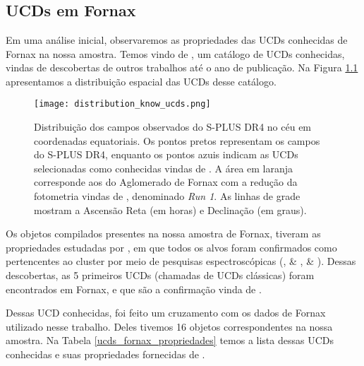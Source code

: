 \chapter{\chapternameanalysis}\label{analise}

\section{UCDs em Fornax}
Em uma análise inicial, observaremos as propriedades das UCDs conhecidas de Fornax na nossa amostra. Temos vindo de \cite{catalog_ucds}, um catálogo de UCDs conhecidas, vindas de descobertas de outros trabalhos até o ano de publicação. Na Figura \ref{distribution_know_ucds} apresentamos a distribuição espacial das UCDs desse catálogo.


\begin{figure}[!ht]
    \centering
    \texttt{[image: distribution\_know\_ucds.png]}
    \caption[]{Distribuição dos campos observados do S-PLUS DR4 no céu em coordenadas equatoriais. Os pontos pretos representam os campos do S-PLUS DR4, enquanto os pontos azuis indicam as UCDs selecionadas como conhecidas vindas de \cite{catalog_ucds}. A área em laranja corresponde aos do Aglomerado de Fornax com a redução da fotometria vindas de \cite{haack2024splusfornaxprojectsfp}, denominado \textit{Run 1}. As linhas de grade mostram a Ascensão Reta (em horas) e Declinação (em graus).}
    \label{distribution_know_ucds}
\end{figure}

\vspace{\baselineskip}

Os objetos compilados presentes na nossa amostra de Fornax, tiveram as propriedades estudadas por \cite{Mieske_2008_2}, em que todos os alvos foram confirmados como pertencentes ao cluster por meio de pesquisas espectroscópicas (\citealt{Drinkwater_2000}, \citealt{Mieske_2002} \& \citeyear{Mieske_2004}, \citealt{Richtler_2004} \& \citeyear{Richtler_2008}). Dessas descobertas, as 5 primeiros UCDs (chamadas de UCDs clássicas) foram encontrados em Fornax, e que são a confirmação vinda de \cite{Drinkwater_2000}.

\vspace{\baselineskip}

Dessas UCD conhecidas, foi feito um cruzamento com os dados de Fornax utilizado nesse trabalho. Deles tivemos 16 objetos correspondentes na nossa amostra. Na Tabela \ref{ucds_fornax_propriedades} temos a lista dessas UCDs conhecidas e suas propriedades fornecidas de \citealt{Mieske_2008_2}.

